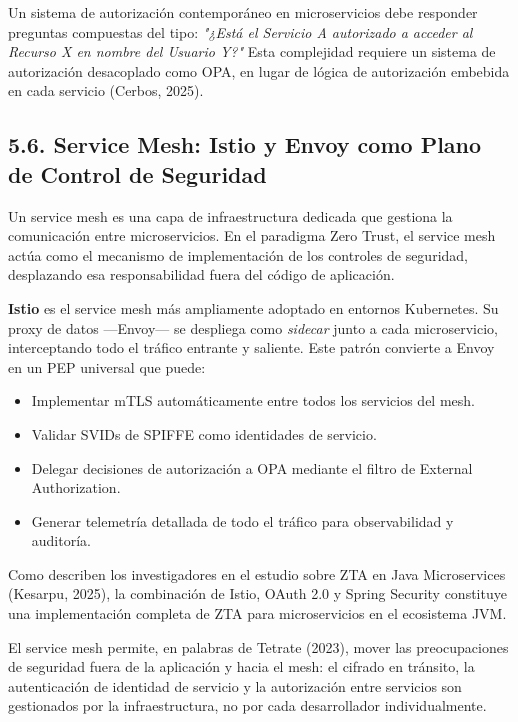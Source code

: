 \documentclass[12pt,a4paper]{article}
\begin{document}
Un sistema de autorización contemporáneo en microservicios debe responder preguntas compuestas del tipo: \textit{"¿Está el Servicio A autorizado a acceder al Recurso X en nombre del Usuario Y?"} Esta complejidad requiere un sistema de autorización desacoplado como OPA, en lugar de lógica de autorización embebida en cada servicio (Cerbos, 2025).

\subsection{5.6. Service Mesh: Istio y Envoy como Plano de Control de Seguridad}

Un service mesh es una capa de infraestructura dedicada que gestiona la comunicación entre microservicios. En el paradigma Zero Trust, el service mesh actúa como el mecanismo de implementación de los controles de seguridad, desplazando esa responsabilidad fuera del código de aplicación.

\textbf{Istio} es el service mesh más ampliamente adoptado en entornos Kubernetes. Su proxy de datos —Envoy— se despliega como \textit{sidecar} junto a cada microservicio, interceptando todo el tráfico entrante y saliente. Este patrón convierte a Envoy en un PEP universal que puede:

\begin{itemize}
  \item Implementar mTLS automáticamente entre todos los servicios del mesh.
  \item Validar SVIDs de SPIFFE como identidades de servicio.
  \item Delegar decisiones de autorización a OPA mediante el filtro de External Authorization.
  \item Generar telemetría detallada de todo el tráfico para observabilidad y auditoría.
\end{itemize}

Como describen los investigadores en el estudio sobre ZTA en Java Microservices (Kesarpu, 2025), la combinación de Istio, OAuth 2.0 y Spring Security constituye una implementación completa de ZTA para microservicios en el ecosistema JVM.

El service mesh permite, en palabras de Tetrate (2023), mover las preocupaciones de seguridad fuera de la aplicación y hacia el mesh: el cifrado en tránsito, la autenticación de identidad de servicio y la autorización entre servicios son gestionados por la infraestructura, no por cada desarrollador individualmente.
\end{document}
